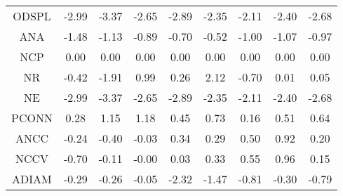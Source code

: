 \documentclass[11pt,a4paper]{report}
\begin{document}
\begin{longtable}{ | c || c | c | c | c | c | c | c || c |}
ODSPL &  \cellcolor[HTML]{FFB7B7} -2.99 &  \cellcolor[HTML]{FFA7A7} -3.37 &  \cellcolor[HTML]{FFBFBF} -2.65 &  \cellcolor[HTML]{FFB7B7} -2.89 &  \cellcolor[HTML]{FFC7C7} -2.35 &  \cellcolor[HTML]{FFC7C7} -2.11 &  \cellcolor[HTML]{FFBFBF} -2.40 &  \cellcolor[HTML]{FFBFBF} -2.68 \\
ANA &  \cellcolor[HTML]{FFD7D7} -1.48 &  \cellcolor[HTML]{FFDFDF} -1.13 &  \cellcolor[HTML]{FFE7E7} -0.89 &  \cellcolor[HTML]{FFEFEF} -0.70 &  \cellcolor[HTML]{FFEFEF} -0.52 &  \cellcolor[HTML]{FFE7E7} -1.00 &  \cellcolor[HTML]{FFE7E7} -1.07 &  \cellcolor[HTML]{FFE7E7} -0.97 \\
NCP &  \cellcolor[HTML]{FFFFFF} 0.00 &  \cellcolor[HTML]{FFFFFF} 0.00 &  \cellcolor[HTML]{FFFFFF} 0.00 &  \cellcolor[HTML]{FFFFFF} 0.00 &  \cellcolor[HTML]{FFFFFF} 0.00 &  \cellcolor[HTML]{FFFFFF} 0.00 &  \cellcolor[HTML]{FFFFFF} 0.00 &  \cellcolor[HTML]{FFFFFF} 0.00 \\
NR &  \cellcolor[HTML]{FFF7F7} -0.42 &  \cellcolor[HTML]{FFCFCF} -1.91 &  \cellcolor[HTML]{E7E7FF} 0.99 &  \cellcolor[HTML]{F7F7FF} 0.26 &  \cellcolor[HTML]{C7C7FF} 2.12 &  \cellcolor[HTML]{FFEFEF} -0.70 &  \cellcolor[HTML]{FFFFFF} 0.01 &  \cellcolor[HTML]{FFFFFF} 0.05 \\
NE &  \cellcolor[HTML]{FFB7B7} -2.99 &  \cellcolor[HTML]{FFA7A7} -3.37 &  \cellcolor[HTML]{FFBFBF} -2.65 &  \cellcolor[HTML]{FFB7B7} -2.89 &  \cellcolor[HTML]{FFC7C7} -2.35 &  \cellcolor[HTML]{FFC7C7} -2.11 &  \cellcolor[HTML]{FFBFBF} -2.40 &  \cellcolor[HTML]{FFBFBF} -2.68 \\
PCONN &  \cellcolor[HTML]{F7F7FF} 0.28 &  \cellcolor[HTML]{DFDFFF} 1.15 &  \cellcolor[HTML]{DFDFFF} 1.18 &  \cellcolor[HTML]{F7F7FF} 0.45 &  \cellcolor[HTML]{EFEFFF} 0.73 &  \cellcolor[HTML]{F7F7FF} 0.16 &  \cellcolor[HTML]{EFEFFF} 0.51 &  \cellcolor[HTML]{EFEFFF} 0.64 \\
ANCC &  \cellcolor[HTML]{FFF7F7} -0.24 &  \cellcolor[HTML]{FFF7F7} -0.40 &  \cellcolor[HTML]{FFFFFF} -0.03 &  \cellcolor[HTML]{F7F7FF} 0.34 &  \cellcolor[HTML]{F7F7FF} 0.29 &  \cellcolor[HTML]{EFEFFF} 0.50 &  \cellcolor[HTML]{E7E7FF} 0.92 &  \cellcolor[HTML]{F7F7FF} 0.20 \\
NCCV &  \cellcolor[HTML]{FFEFEF} -0.70 &  \cellcolor[HTML]{FFFFFF} -0.11 &  \cellcolor[HTML]{FFFFFF} -0.00 &  \cellcolor[HTML]{FFFFFF} 0.03 &  \cellcolor[HTML]{F7F7FF} 0.33 &  \cellcolor[HTML]{EFEFFF} 0.55 &  \cellcolor[HTML]{E7E7FF} 0.96 &  \cellcolor[HTML]{FFFFFF} 0.15 \\
ADIAM &  \cellcolor[HTML]{FFF7F7} -0.29 &  \cellcolor[HTML]{FFF7F7} -0.26 &  \cellcolor[HTML]{FFFFFF} -0.05 &  \cellcolor[HTML]{FFC7C7} -2.32 &  \cellcolor[HTML]{FFD7D7} -1.47 &  \cellcolor[HTML]{FFE7E7} -0.81 &  \cellcolor[HTML]{FFF7F7} -0.30 &  \cellcolor[HTML]{FFEFEF} -0.79 \\

\end{longtable}
\end{document}
